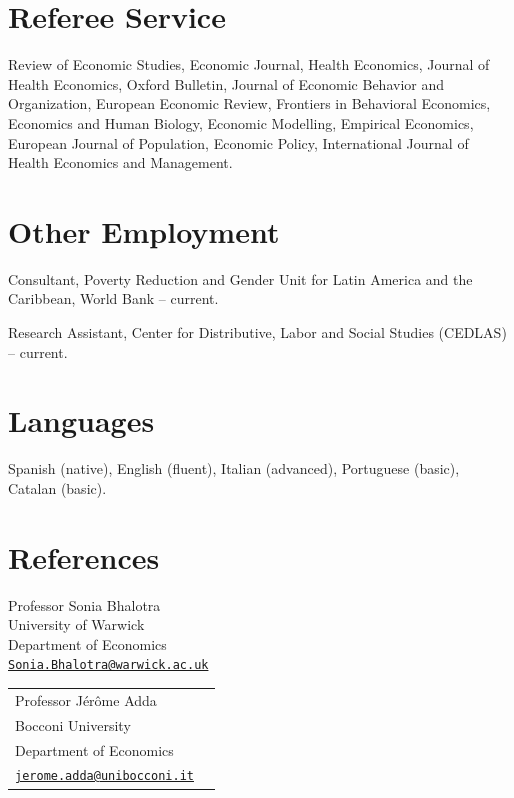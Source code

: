 \documentclass[letterpaper]{article}
\renewenvironment{itemize}{
  \begin{list}{}{
    \setlength{\leftmargin}{1.5em}
  }
}{
  \end{list}
}
\newcommand{\cvIfBlank}[3]{\if\relax\detokenize{#1}\relax#2\else#3\fi}
\def\cvSplitDate#1-#2\relax{\cvMonthName{#2}#1}
\newcommand{\cvMonthName}[1]{%
  \ifcase#1\or Jan\or Feb\or Mar\or Apr\or May\or Jun\or Jul\or Aug\or Sep\or
  Oct\or Nov\or Dec\fi}
\newcommand{\cvDate}[1]{\cvSplitDate#1\relax}
\newcommand{\cvposition}[5]{%
  \item #1, #2 \cvDate{#4} -- \cvIfBlank{#5}{current}{\cvDate{#5}}.%
}
\newcommand{\cvbullet}[1]{\item #1}
\begin{document}
\section*{Referee Service}
\begin{itemize}
	\cvbullet{Review of Economic Studies, Economic Journal, Health Economics, Journal of Health Economics, Oxford Bulletin, Journal of Economic Behavior and Organization, European Economic Review, Frontiers in Behavioral Economics, Economics and Human Biology, Economic Modelling, Empirical Economics, European Journal of Population, Economic Policy, International Journal of Health Economics and Management.}
\end{itemize}

\section*{Other Employment}
\begin{itemize}
	\cvposition{Consultant, Poverty Reduction and Gender Unit for Latin America and the Caribbean}{World Bank}{Washington DC, US}{2010-01}{2012-12}
	\cvposition{Research Assistant}{Center for Distributive, Labor and Social Studies (CEDLAS)}{La Plata, Argentina}{2008-01}{2010-12}
\end{itemize}

\section*{Languages}
\begin{itemize}
	\cvbullet{Spanish (native), English (fluent), Italian (advanced), Portuguese (basic), Catalan (basic).}
\end{itemize}

\section*{References}

\begin{minipage}{0.45\linewidth}
		Professor Sonia Bhalotra \\
		University of Warwick \\
		Department of Economics \\
		\href{mailto:Sonia.Bhalotra@warwick.ac.uk}{\tt Sonia.Bhalotra@warwick.ac.uk}
\end{minipage}
\begin{minipage}{0.45\linewidth}
	\begin{tabular}{ll}
		Professor J\'{e}r\^{o}me Adda \\
		Bocconi University \\
		Department of Economics \\
		\href{mailto:jerome.adda@unibocconi.it}{\tt jerome.adda@unibocconi.it}
	\end{tabular}
\end{minipage}
\end{document}
